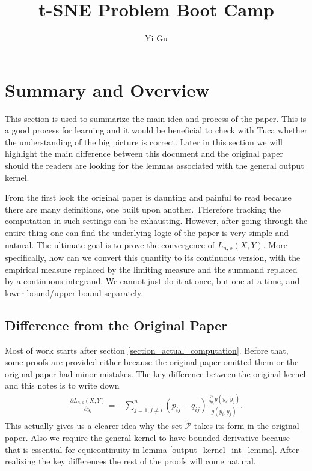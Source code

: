 \documentclass[10pt]{article}
\author{Yi Gu}
\newenvironment{Proof of lemma}{\noindent{\bf Proof of Lemma}}{\hfill$\Box$\newline}
\newenvironment{Proof of claim}{\noindent{\bf Proof of claim}}{\hfill$\Box$\newline}
\newenvironment{Proof of theorem}{\noindent{\bf Proof of Theorem}}{\hfill\scriptsize{$\Box$}\newline}
\newenvironment{Proof of theorems}{\noindent{\bf Proof of Theorems}}{\hfill$\Box$\newline}
\newenvironment{Proof of proposition}{\noindent{\bf Proof of Proposition}}{\hfill$\Box$\newline}
\newenvironment{Proof of propositions}{\noindent{\bf Proof of Propositions}}{\hfill$\Box$\newline}
\newenvironment{Proof of exercise}{\noindent{\it Proof of Exercise:}}{\hfill$\Box$}
\numberwithin{equation}{section}
\begin{document}
\title{t-SNE Problem Boot Camp}
\maketitle
\tableofcontents
\section{Summary and Overview}
This section is used to summarize the main idea and process of the paper. This
is a good process for learning and it would be beneficial to check with Tuca
whether the understanding of the big picture is correct. Later in this section
we will highlight the main difference between this document and the original
paper should the readers are looking for the lemmas associated with the general
output kernel.

From the first look the original paper \cite{auffinger-tsne} is daunting and
painful to read because there are many definitions, one built upon another.
THerefore tracking the computation in such settings can be exhausting. However,
after going through the entire thing one can find the underlying logic of the
paper is very simple and natural. The ultimate goal is to prove the convergence of
$L_{n,\rho}(X,Y)$. More specifically, how can we convert this quantity to its
continuous version, with the empirical measure replaced by the limiting
measure and the summand replaced by a continuous integrand. We cannot just do
it at once, but one at a time, and lower bound/upper bound
separately.
\subsection*{Difference from the Original Paper}
Most of work starts after section \ref{section_actual_computation}. Before
that, some proofs are provided either because the original paper omitted them
or the original paper had minor mistakes. The key difference between the
original kernel and this notes is to write down
\begin{align}
    \frac{\partial L_{n, \rho}(X,Y)}{\partial y_i} = -\sum_{j=1, j \neq i}^n (p_{ij}-q_{ij}) \frac{\frac{\partial}{\partial y_i}g(y_i,y_j)}{g(y_i,y_j)}.
\end{align}
This actually gives us a clearer idea why the set $\tilde{\mathcal{P}}$ takes its form in the original paper. Also we require the general kernel to have bounded derivative because that is essential for equicontinuity in lemma \ref{output_kernel_int_lemma}. After realizing the key differences the rest of the proofs will come natural.
\end{document}
